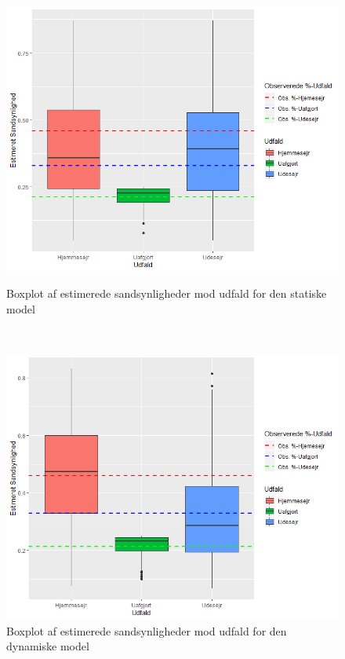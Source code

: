 \documentclass[11pt,a4paper]{article}
\begin{document}
\begin{figure}[ht]
  \centering
  \begin{minipage}[b]{0.6\textwidth}
    \includegraphics[width=\textwidth]{EstSSHStatisk.png}
    \caption{Boxplot af estimerede sandsynligheder mod udfald for den statiske model}
  \end{minipage}
  \\
  \begin{minipage}[b]{0.6\textwidth}
    \includegraphics[width=\textwidth]{EstSSHDyn.png}
    \caption{Boxplot af estimerede sandsynligheder mod udfald for den dynamiske model}
  \end{minipage}
\end{figure}
\end{document}
